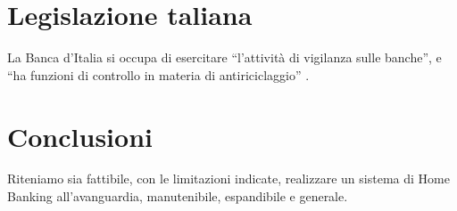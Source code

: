 \documentclass[]{softeng}
\begin{document}
\section{Legislazione taliana}

La Banca d'Italia si occupa di esercitare ``l'attivit\`a di vigilanza sulle banche'', e ``ha funzioni di controllo in materia di antiriciclaggio'' \cite[Funzioni]{banca_italia}.

\section{Conclusioni}

Riteniamo sia fattibile, con le limitazioni indicate, realizzare un sistema di Home Banking all'avanguardia, manutenibile, espandibile e generale.

\renewcommand{\refname}{Riferimenti}
\printbibliography
\end{document}
